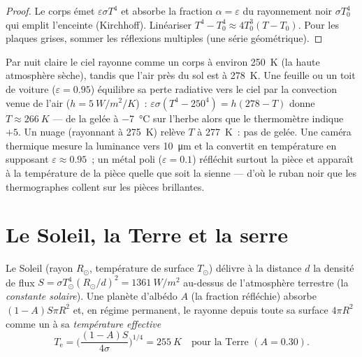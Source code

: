 \begin{proof}
Le corps émet $\varepsilon\sigma T^4$ et absorbe la fraction $\alpha =
\varepsilon$ du rayonnement noir $\sigma T_0^4$ qui emplit l'enceinte
(Kirchhoff). Linéariser $T^4 - T_0^4 \approx 4T_0^3(T - T_0)$. Pour les
plaques grises, sommer les réflexions multiples (une série géométrique).
\end{proof}

\begin{example}\label{ex:b2:thermal-radiation:frost}
Par nuit claire le ciel rayonne comme un corps à environ \qty{250}{K}
(la haute atmosphère sèche), tandis que l'air près du sol est à
\qty{278}{K}. Une feuille ou un toit de voiture ($\varepsilon = 0.95$) équilibre sa
perte radiative vers le ciel par la convection venue de l'air ($h =
\qty{5}{W/m^2/K}$)~: $\varepsilon\sigma(T^4 - 250^4) = h(278 - T)$ donne $T
\approx \qty{266}{K}$ --- de la gelée à \qty{-7}{\celsius} sur l'herbe alors que
le thermomètre indique $+5$. Un nuage (rayonnant à \qty{275}{K}) relève $T$
à \qty{277}{K}~: pas de gelée. Une caméra thermique mesure la luminance vers
\qty{10}{\micro m} et la convertit en température en supposant
$\varepsilon \approx 0.95$~; un métal poli ($\varepsilon = 0.1$) réfléchit
surtout la pièce et apparaît à la température de la pièce quelle que soit la
sienne --- d'où le ruban noir que les thermographes collent sur les pièces brillantes.
\end{example}

\section{Le Soleil, la Terre et la serre}

\begin{proposition}\label{prop:b2:thermal-radiation:earth}
Le Soleil (rayon $R_\odot$, température de surface $T_\odot$) délivre à la
distance $d$ la densité de flux $S = \sigma T_\odot^4 (R_\odot/d)^2 =
\qty{1361}{W/m^2}$ au-dessus de l'atmosphère terrestre (la \emph{constante
solaire}). Une planète d'albédo $A$ (la fraction
réfléchie) absorbe $(1 - A)S\pi R^2$ et, en régime permanent, le rayonne
depuis toute sa surface $4\pi R^2$ comme un  à sa \emph{température
effective}
\[
T_{\text{e}} = \Big(\frac{(1 - A)S}{4\sigma}\Big)^{1/4} = \qty{255}{K}
\quad\text{pour la Terre } (A = 0.30) .
\]
\end{proposition}

